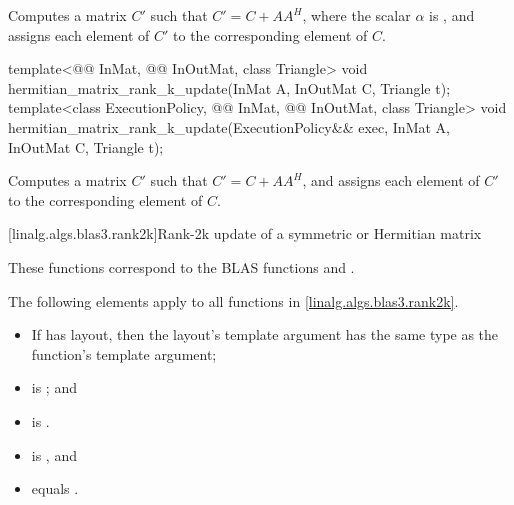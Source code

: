 \begin{itemdescr}
\pnum
\effects
Computes a matrix $C'$ such that $C' = C + A A^H$,
where the scalar $\alpha$ is ,
and assigns each element of $C'$ to the corresponding element of $C$.
\end{itemdescr}

\begin{itemdecl}
template<@@ InMat, @@ InOutMat, class Triangle>
  void hermitian_matrix_rank_k_update(InMat A, InOutMat C, Triangle t);
template<class ExecutionPolicy,
         @@ InMat, @@ InOutMat, class Triangle>
  void hermitian_matrix_rank_k_update(ExecutionPolicy&& exec,
                                      InMat A, InOutMat C, Triangle t);
\end{itemdecl}

\begin{itemdescr}
\pnum
\effects
Computes a matrix $C'$ such that $C' = C + A A^H$, and
assigns each element of $C'$ to the corresponding element of $C$.
\end{itemdescr}

[linalg.algs.blas3.rank2k]{Rank-2k update of a symmetric or Hermitian matrix}

\pnum
\begin{note}
These functions correspond to the BLAS functions
 and .
\end{note}

\pnum
The following elements apply to all functions in \ref{linalg.algs.blas3.rank2k}.

\pnum
\mandates
\begin{itemize}
\item
If  has  layout,
then the layout's  template argument has
the same type as the function's  template argument;
\item
{}
is ; and
\item
{}
is .
\end{itemize}

\pnum
\expects
\begin{itemize}
\item
{} is , and
\item
{} equals .
\end{itemize}

